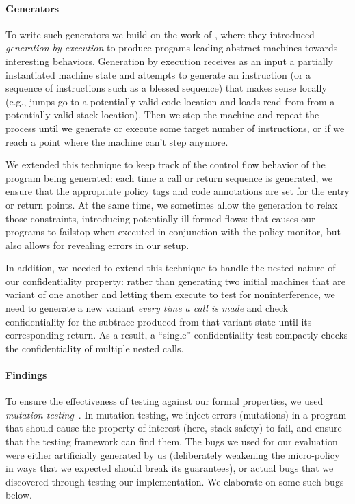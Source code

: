 \documentclass[acmsmall,review,anonymous]{acmart}\settopmatter{printfolios=true,printccs=false,printacmref=false}
\begin{document}
\paragraph*{Generators}

To write such generators we build on the work of
\citep{TestingNI:ICFP, DBLP:journals/jfp/HritcuLSADHPV16}, where they
introduced {\em generation by execution} to produce progams leading
abstract machines towards interesting behaviors. Generation by
execution receives as an input a partially instantiated machine state
and attempts to generate an instruction (or a sequence of instructions
such as a blessed sequence) that makes sense locally (e.g., jumps go
to a potentially valid code location and loads read from from a
potentially valid stack location). Then we step the machine and repeat
the process until we generate or execute some target number of
instructions, or if we reach a point where the machine can't step
anymore.

We extended this technique to keep track of the control flow behavior of
the program being generated: each time a call or return sequence is
generated, we ensure that the appropriate policy tags and code
annotations are set for the entry or return points. At the same time,
we sometimes allow the generation to relax those constraints,
introducing potentially ill-formed flows: that causes our programs
to failstop when executed in conjunction with the policy monitor,
but also allows for revealing errors in our setup.

In addition, we needed to extend this technique to handle the nested
nature of our confidentiality property: rather than generating two
initial machines that are variant of one another and letting them
execute to test for noninterference, we need to generate a new variant
{\em every time a call is made} and check confidentiality for the
subtrace produced from that variant state until its corresponding
return. As a result, a ``single'' confidentiality test compactly
checks the confidentiality of multiple nested calls.

\paragraph*{Findings}

To ensure the effectiveness of testing against our formal properties, we
used {\em mutation testing}~\citep{JiaH11}. In mutation testing, we inject errors
(mutations) in a program that should cause the property of interest (here,
stack safety) to fail, and ensure that the testing framework can find
them. The bugs we used for our evaluation were either artificially generated
by us (deliberately weakening the micro-policy in ways that we expected
should break its guarantees), or actual bugs that we discovered through
testing our implementation. We elaborate on some such bugs below.
\end{document}
